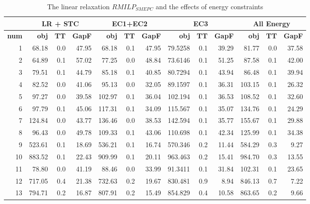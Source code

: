 \documentclass[11pt]{article}
\theoremstyle{plain}%
\theoremstyle{definition} \newtheorem{lem}{Lemma}[section]
\theoremstyle{definition} \newtheorem{claim}{Claim}[lem]
\theoremstyle{definition} \newtheorem{theorem}{Theorem}[section]
\theoremstyle{definition} \newtheorem{exo}{Exercice n$^\circ$}
\theoremstyle{definition} \newtheorem{quest}{}[exo]
\theoremstyle{definition} \newtheorem{sousquest}{}[quest]
\theoremstyle{remark}
\theoremstyle{definition}
\begin{document}
\begin{table}[H]
  \centering
  \small
  \caption{The linear relaxation $RMILP_{SMEPC}$ and the effects of energy constraints}
    \begin{tabular}{r|rrr|rrr|rrr|rrr|}
    \toprule
    &\multicolumn{3}{c|}{\textbf{LR + STC}} & \multicolumn{3}{c|}{\textbf{EC1+EC2}}&\multicolumn{3}{c|}{\textbf{EC3}}&\multicolumn{3}{c|}{\textbf{All Energy}} \\
    \midrule
    \textbf{num} & \textbf{obj} & \textbf{TT} & \textbf{GapF} & \textbf{obj} & \textbf{TT}  & \textbf{GapF} & \textbf{obj} & \textbf{TT} &  \textbf{GapF} &\textbf{obj} & \textbf{TT} & \textbf{GapF} \\
    \midrule
    1     & 68.18 & 0.0   & 47.95  & 68.18 & 0.1  & 47.95  & 79.5258 & 0.1   & 39.29 & 81.77 & 0.0   & 37.58 \\
    2     & 64.89 & 0.1   & 57.02  & 77.25 & 0.0   & 48.84  & 73.6146 & 0.1    & 51.25 & 87.58 & 0.1   &42.00 \\
    3     & 79.51 & 0.1   & 44.79 & 85.18 & 0.1   & 40.85 & 80.7294 & 0.1     & 43.94 & 86.48 & 0.1   & 39.94 \\
    4     & 82.52 & 0.0   & 41.06 &  95.13 & 0.0   &  32.05& 89.1597 & 0.1    & 36.31 & 103.15 & 0.1  & 26.32 \\
    5     & 97.27 & 0.0   & 39.58 & 102.97 & 0.1   & 36.04 & 102.194 & 0.1    & 36.53 & 108.52 & 0.1   &  32.60 \\
    6     & 97.79 & 0.1   & 45.06 &  117.31 & 0.1   &  34.09  & 115.567 & 0.1    & 35.07 & 134.76 & 0.1  & 24.29 \\
    7     & 124.84 & 0.0   & 43.77 &  136.46 & 0.0   &  38.53  & 142.594 & 0.1  &  35.77 & 155.67 & 0.1   & 29.88\\
    8     & 96.43 & 0.0   & 49.78 &  109.33 & 0.1   & 43.06  & 110.698 & 0.1  & 42.34 & 125.99 & 0.1 & 34.38 \\
    9     & 523.61 & 0.1   & 18.69 & 536.21 & 0.1   &16.74 & 570.346 & 0.2   & 11.44 & 584.29 & 0.3   &  9.27 \\
    10    & 883.52 & 0.1   & 22.43 &  909.99 & 0.1   &  20.11& 963.463 & 0.2 & 15.41 & 984.70 & 0.3   & 13.55  \\
    11    & 78.80 & 0.0   & 41.19 & 88.46 & 0.0   & 33.99 & 91.3411 & 0.1  & 31.84 & 102.31 & 0.1   & 23.65 \\
    12    & 717.05 & 0.4   & 21.38 &  732.63 & 0.2   &  19.67 & 830.481 & 0.9 & 8.94  & 846.13 & 0.7   & 7.22 \\
    13    & 794.71 & 0.2   & 16.87 & 807.91 & 0.2   &  15.49  & 854.829 & 0.4  & 10.58 & 863.65 & 0.2   & 9.66 \\

\end{tabular}
\end{table}
\end{document}
